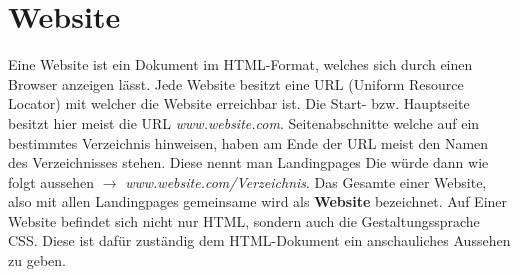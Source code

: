 \section{Website}
\label{website}

Eine Website ist ein Dokument im HTML-Format, welches sich durch einen Browser anzeigen lässt.
Jede Website besitzt eine URL (Uniform Resource Locator) mit welcher die Website erreichbar ist.
Die Start- bzw. Hauptseite besitzt hier meist die URL \textit{www.website.com}. Seitenabschnitte 
welche auf ein bestimmtes Verzeichnis hinweisen, haben am Ende der URL meist den Namen des 
Verzeichnisses stehen. Diese nennt man Landingpages Die würde dann wie folgt aussehen $\rightarrow$ 
\textit{www.website.com/Verzeichnis}. Das Gesamte einer Website, also mit allen Landingpages 
gemeinsame wird als \textbf{Website} bezeichnet. Auf Einer Website befindet sich nicht nur HTML, 
sondern auch die Gestaltungssprache CSS. Diese ist dafür zuständig dem HTML-Dokument ein 
anschauliches Aussehen zu geben.~\cite{Website}